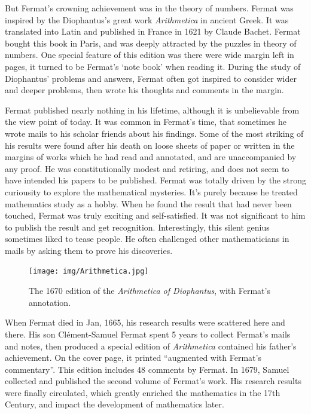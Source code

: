 \documentclass[b5paper]{article}
\begin{document}
But Fermat's crowning achievement was in the theory of numbers. Fermat was inspired by the Diophantus's great work {\em Arithmetica} in ancient Greek. It was translated into Latin and published in France in 1621 by Claude Bachet. Fermat bought this book in Paris, and was deeply attracted by the puzzles in theory of numbers. One special feature of this edition was there were wide margin left in pages, it turned to be Fermat's `note book' when reading it. During the study of Diophantus' problems and answers, Fermat often got inspired to consider wider and deeper problems, then wrote his thoughts and comments in the margin.

Fermat published nearly nothing in his lifetime, although it is unbelievable from the view point of today. It was common in Fermat's time, that sometimes he wrote mails to his scholar friends about his findings. Some of the most striking of his results were found after his death on loose sheets of paper or written in the margins of works which he had read and annotated, and are unaccompanied by any proof. He was constitutionally modest and retiring, and does not seem to have intended his papers to be published. Fermat was totally driven by the strong curiousity to explore the mathematical mysteries. It's purely because he treated mathematics study as a hobby. When he found the result that had never been touched, Fermat was truly exciting and self-satisfied. It was not significant to him to publish the result and get recognition\cite{HanXueTao2009}. Interestingly, this silent genius sometimes liked to tease people. He often challenged other mathematicians in mails by asking them to prove his discoveries.

\begin{figure}
 \centering
 \texttt{[image: img/Arithmetica.jpg]}
 \captionsetup{labelformat=empty}
 \caption{The 1670 edition of the {\em Arithmetica of Diophantus}, with Fermat's annotation.}
 \label{fig:Arithmetica}
\end{figure}

When Fermat died in Jan, 1665, his research results were scattered here and there. His son Clément-Samuel Fermat spent 5 years to collect Fermat's mails and notes, then produced a special edition of {\em Arithmetica} contained his father's achievement. On the cover page, it printed ``augmented with Fermat's commentary''. This edition includes 48 comments by Fermat. In 1679, Samuel collected and published the second volume of Fermat's work. His research results were finally circulated, which greatly enriched the mathematics in the 17th Century, and impact the development of mathematics later.
\end{document}
